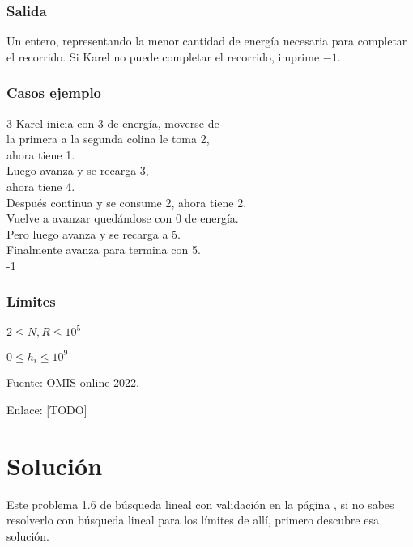 \subsubsection*{Salida}
Un entero, representando la menor cantidad de energía necesaria para completar el recorrido. Si Karel no puede completar el recorrido, imprime \(-1\).

\subsubsection*{Casos ejemplo}
\begin{casebox3}	
	{3}
	{
		Karel inicia con 3 de energía, moverse de   \\
		la primera a la segunda colina le toma 2,  \\
		ahora tiene 1.\\
		Luego avanza y se recarga 3,\\
		ahora tiene 4.\\
		Después continua y se consume 2, ahora tiene 2. \\
		Vuelve a avanzar quedándose con 0 de energía. \\		
		Pero luego avanza y se recarga a 5. \\
		Finalmente avanza para termina con 5. \\
	}
	{-1}
	{}
	\hline
\end{casebox3}	

\subsubsection*{Límites}
\begin{plimits}
	\item \(2\leq N, R \leq 10^5\)
	\item \(0\leq h_i\leq 10^9\)
\end{plimits}

Fuente: OMIS online 2022.

Enlace: [TODO]

\section*{Solución}
Este problema 1.6 de búsqueda lineal con validación en la página \pageref{bicicleta}, si no sabes resolverlo con búsqueda lineal para los límites de allí, primero descubre esa solución.

